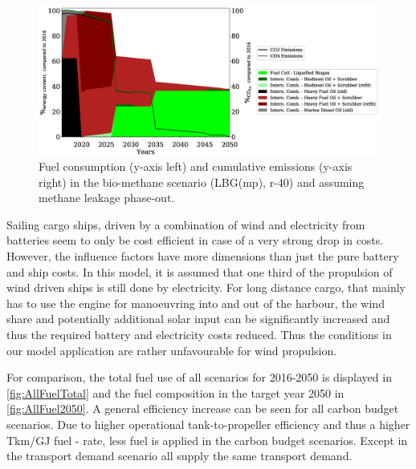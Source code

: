 \documentclass[article]{elsarticle}
\begin{document}
\begin{figure}
    \centering
    \includegraphics[width=\textwidth]{figures/LBG_MP_fuels_emissions.eps}
    \caption{Fuel consumption (y-axis left) and cumulative emissions (y-axis right) in the bio-methane scenario (LBG(mp), r-40) and assuming methane leakage phase-out.}
    \label{fig:LBG}
\end{figure}

Sailing cargo ships, driven by a combination of wind and electricity from batteries seem to only be cost efficient in case of a very strong drop in costs. However, the influence factors have more dimensions than just the pure battery and ship costs. In this model, it is assumed that one third of the propulsion of wind driven ships is still done by electricity. For long distance cargo, that mainly has to use the engine for manoeuvring into and out of the harbour, the wind share and potentially additional solar input can be significantly increased and thus the required battery and electricity costs reduced. Thus the conditions in our model application are rather unfavourable for wind propulsion.

For comparison, the total fuel use of all scenarios for 2016-2050 is displayed in \autoref{fig:AllFuelTotal} and the fuel composition in the target year 2050 in \autoref{fig:AllFuel2050}. A general efficiency increase can be seen for all carbon budget scenarios. Due to higher operational tank-to-propeller efficiency and thus a higher Tkm/GJ fuel - rate, less fuel is applied in the carbon budget scenarios. Except in the transport demand scenario all supply the same transport demand.
\end{document}
